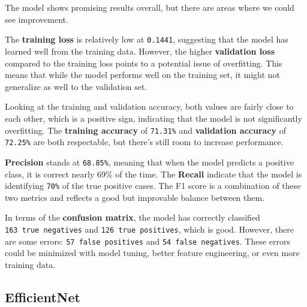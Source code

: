 \documentclass[12pt]{article}
\begin{document}
    \begin{center}
    \end{center}
    { \hspace*{\fill} \\}
    
    \begin{center}
    \end{center}
    { \hspace*{\fill} \\}
    
    The model shows promising results overall, but there are areas where we
could see improvement.

The \textbf{training loss} is relatively low at \texttt{0.1441},
suggesting that the model has learned well from the training data.
However, the higher \textbf{validation loss} compared to the training
loss points to a potential issue of overfitting. This means that while
the model performs well on the training set, it might not generalize as
well to the validation set.

Looking at the training and validation accuracy, both values are fairly
close to each other, which is a positive sign, indicating that the model
is not significantly overfitting. The \textbf{training accuracy} of
\texttt{71.31\%} and \textbf{validation accuracy} of \texttt{72.25\%}
are both respectable, but there's still room to increase performance.

\textbf{Precision} stands at \texttt{68.85\%}, meaning that when the
model predicts a positive class, it is correct nearly 69\% of the time.
The \textbf{Recall} indicate that the model is identifying \texttt{70\%}
of the true positive cases. The F1 score is a combination of these two
metrics and reflects a good but improvable balance between them.

In terms of the \textbf{confusion matrix}, the model has correctly
classified \texttt{163\ true\ negatives} and
\texttt{126\ true\ positives}, which is good. However, there are some
errors: \texttt{57\ false\ positives} and \texttt{54\ false\ negatives}.
These errors could be minimized with model tuning, better feature
engineering, or even more training data.

    \subsection{EfficientNet}\label{efficientnet}
\end{document}
